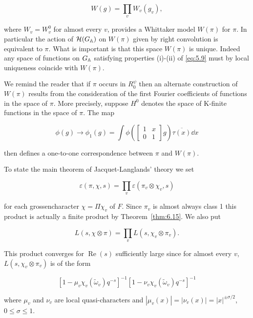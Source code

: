 \[
W(g) = \prod_v W_v(g_v),
\]

where $W_v = W_v^0$ for almost every $v$, provides a Whittaker model $W(\pi)$ for $\pi$. In particular the action of $\mathcal{H}(G_{\mathbb{A}})$ on $W(\pi)$ given by right convolution is equivalent to $\pi$. What is important is that this space $W(\pi)$ is unique. Indeed any space of functions on $G_{\mathbb{A}}$ satisfying properties (i)-(ii) of \eqref{eq:5.9} must by local uniqueness coincide with $W(\pi)$.

We remind the reader that if $\pi$ occurs in $R_0^{\psi}$ then an alternate construction of $W(\pi)$ results from the consideration of the first Fourier coefficients of functions in the space of $\pi$. More precisely, suppose $H^0$ denotes the space of K-finite functions in the space of $\pi$. The map

\[
\phi(g) \to \phi_1(g) = \int \phi\!\left(\begin{bmatrix} 1 & x \\ 0 & 1 \end{bmatrix} g\right) \overline{\tau(x)} \dd x
\]

then defines a one-to-one correspondence between $\pi$ and $W(\pi)$.

To state the main theorem of Jacquet-Langlands' theory we set

\begin{equation}\label{eq:6.42}
\varepsilon(\pi, \chi, s) = \prod_v \varepsilon(\pi_v \otimes \chi_v, s)\tag{6.42}
\end{equation}

for each grossencharacter $\chi = \Pi\chi_v$ of $F$. Since $\pi_v$ is almost always class 1 this product is actually a finite product by Theorem~\ref{thm:6.15}. We also put

\begin{equation}\label{eq:6.43}
L(s, \chi \otimes \pi) = \prod_v L(s, \chi_v \otimes \pi_v).\tag{6.43}
\end{equation}

This product converges for $\operatorname{Re}(s)$ sufficiently large since for almost every $v$, $L(s, \chi_v \otimes \pi_v)$ is of the form

\[
[1 - \mu_v\chi_v(\tilde{\omega}_v)q^{-s}]^{-1}[1 - \nu_v\chi_v(\tilde{\omega}_v)q^{-s}]^{-1}
\]

where $\mu_v$ and $\nu_v$ are local quasi-characters and $|\mu_v(x)| = |\nu_v(x)| = |x|^{\pm \sigma/2}$, $0 \leq \sigma \leq 1$.

